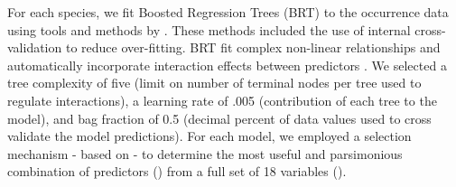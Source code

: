 For each species, we fit Boosted Regression Trees (BRT) \citep{frie02} to the occurrence data using tools and methods by \cite{elit08}. These methods included the use of internal cross-validation to reduce over-fitting. BRT fit complex non-linear relationships and automatically incorporate interaction effects between predictors \citep{elit09}. We selected a tree complexity of five (limit on number of terminal nodes per tree used to regulate interactions), a learning rate of .005 (contribution of each tree to the model), and bag fraction of 0.5 (decimal percent of data values used to cross validate the model predictions). For each model, we employed a selection mechanism - based on \cite{elit08} - to determine the most useful and parsimonious combination of predictors () from a full set of 18 variables ().

